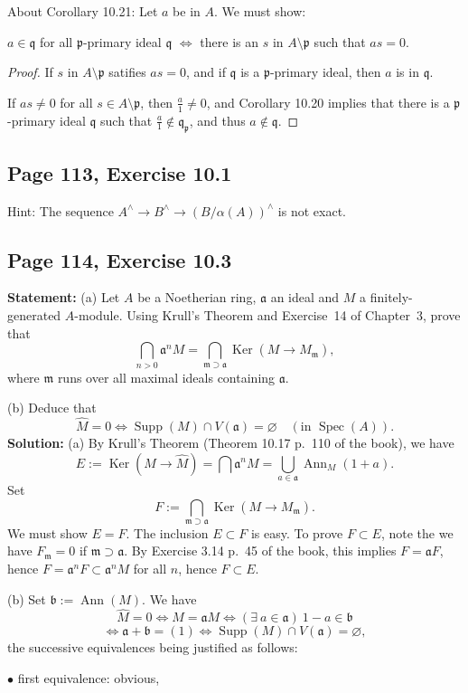 \documentclass[parskip=half,fontsize=12pt]{scrartcl}%
\newcommand{\oo}{\operatorname}\newcommand{\ooo}{\operatorname*}
\newcommand{\mf}{\mathfrak}
\newcommand{\aaa}{\mf a}
\newcommand{\bbb}{\mf b}
\newcommand{\mmm}{\mf m}
\newcommand{\ppp}{\mf p}
\newcommand{\qqq}{\mf q}
\newcommand{\bu}{\bullet}
\newcommand{\Ker}{\operatorname{Ker}}\newcommand{\Coker}{\operatorname{Coker}}
\newcommand{\Spec}{\operatorname{Spec}}\newcommand{\Sp}{\operatorname{Spec}}
\begin{document}
About Corollary 10.21: Let $a$ be in $A$. We must show: 

$a\in\qqq$ for all $\ppp$-primary ideal $\qqq$ $\iff$ there is an $s$ in $A\setminus\ppp$ such that $as=0$. 

\begin{proof} 
If $s$ in $A\setminus\ppp$ satifies $as=0$, and if $\qqq$ is a $\ppp$-primary ideal, then $a$ is in $\qqq$.

If $as\neq0$ for all $s\in A\setminus\ppp$, then $\frac a1\neq0$, and Corollary 10.20 implies that there is a $\ppp$-primary ideal $\qqq$ such that $\frac a1\notin\qqq_\ppp$, and thus $a\notin\qqq$. 
\end{proof}

\subsection{Page 113, Exercise 10.1}%

Hint: The sequence $A^\land\to B^\land\to(B/\alpha(A))^\land$ is not exact. 

\subsection{Page 114, Exercise 10.3}%

\textbf{Statement:} (a) Let $A$ be a Noetherian ring, $\aaa$ an ideal and $M$ a finitely-generated $A$-module. Using Krull's Theorem and Exercise~14 of Chapter~3, prove that 
$$
\bigcap_{n>0}\aaa^nM=\bigcap_{\mmm\supset\aaa}\Ker(M\to M_\mmm),
$$ 
where $\mmm$ runs over all maximal ideals containing $\aaa$.

(b) Deduce that
$$
\widehat M=0\iff\oo{Supp}(M)\cap V(\aaa)=\varnothing\quad(\text{in }\Spec(A)).
$$
\textbf{Solution:} (a) By Krull's Theorem (Theorem 10.17 p.~110 of the book), we have 
$$
E:=\Ker(M\to\widehat M)=\bigcap\aaa^nM=\bigcup_{a\in\aaa}\oo{Ann}_M(1+a). 
$$ 
Set 
$$
F:=\bigcap_{\mmm\supset\aaa}\Ker(M\to M_\mmm). 
$$ 
We must show $E=F$. The inclusion $E\subset F$ is easy. To prove $F\subset E$, note the we have $F_\mmm=0$ if $\mmm\supset\aaa$. By Exercise 3.14 p.~45 of the book, this implies $F=\aaa F$, hence $F=\aaa^nF\subset\aaa^nM$ for all $n$, hence $F\subset E$. 

(b) Set $\bbb:=\oo{Ann}(M)$. We have 
$$
\widehat M=0\iff M=\aaa M\iff(\exists\ a\in\aaa)\ 1-a\in\bbb
$$ 
$$
\iff\aaa+\bbb=(1)\iff\oo{Supp}(M)\cap V(\aaa)=\varnothing,
$$ 
the successive equivalences being justified as follows:

$\bu$ first equivalence: obvious, %
\end{document}
